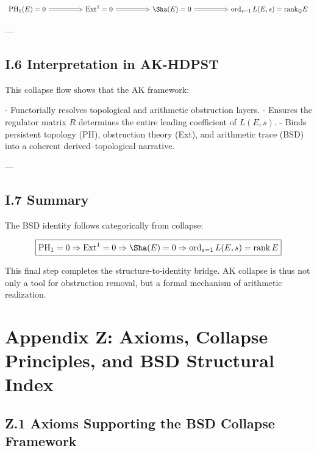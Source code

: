\[
\begin{tikzcd}[row sep=large, column sep=huge]
\mathrm{PH}_1(E) = 0 \arrow[r, Rightarrow] & 
\mathrm{Ext}^1 = 0 \arrow[r, Rightarrow] & 
\Sha(E) = 0 \arrow[r, Rightarrow] & 
\operatorname{ord}_{s=1} L(E,s) = \mathrm{rank}_\mathbb{Q} E
\end{tikzcd}
\]

---

\subsection*{I.6 Interpretation in AK-HDPST}

This collapse flow shows that the AK framework:

- Functorially resolves topological and arithmetic obstruction layers.
- Ensures the regulator matrix \( R \) determines the entire leading coefficient of \( L(E,s) \).
- Binds persistent topology (PH), obstruction theory (Ext), and arithmetic trace (BSD) into a coherent derived–topological narrative.

---

\subsection*{I.7 Summary}

The BSD identity follows categorically from collapse:

\[
\boxed{
\mathrm{PH}_1 = 0 \Rightarrow \mathrm{Ext}^1 = 0 \Rightarrow \Sha(E) = 0 \Rightarrow \operatorname{ord}_{s=1} L(E,s) = \operatorname{rank} E
}
\]

This final step completes the structure-to-identity bridge.  
AK collapse is thus not only a tool for obstruction removal,  
but a formal mechanism of arithmetic realization.



\section*{Appendix Z: Axioms, Collapse Principles, and BSD Structural Index}

\subsection*{Z.1 Axioms Supporting the BSD Collapse Framework}

